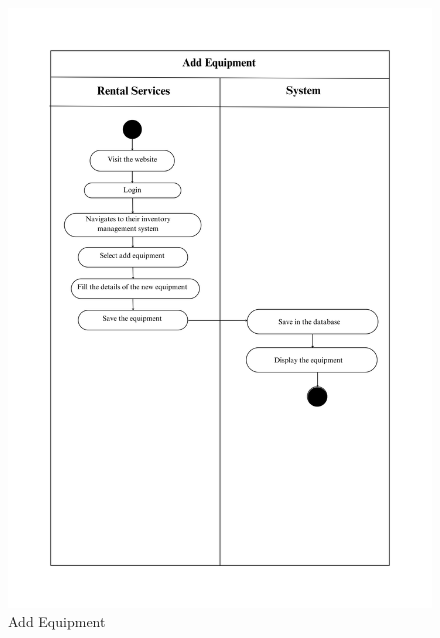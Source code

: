 \begin{figure}[h]
    \centering
    \includegraphics[width=1\textwidth]{Images/Activity Diagrams/19 Add Equipment.png}
    \caption{ Add Equipment }
    \label{fig:activity-add-equ}
\end{figure}

